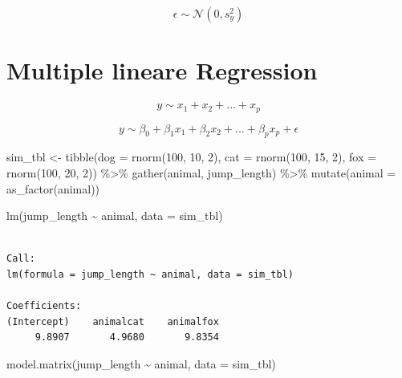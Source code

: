 \documentclass[
  letterpaper,
  DIV=11,
  oneside]{scrreport}
\newenvironment{Shaded}{\begin{snugshade}}{\end{snugshade}}
\newcommand{\AttributeTok}[1]{\textcolor[rgb]{0.40,0.45,0.13}{#1}}
\newcommand{\DecValTok}[1]{\textcolor[rgb]{0.68,0.00,0.00}{#1}}
\newcommand{\FunctionTok}[1]{\textcolor[rgb]{0.28,0.35,0.67}{#1}}
\newcommand{\NormalTok}[1]{\textcolor[rgb]{0.00,0.23,0.31}{#1}}
\newcommand{\OtherTok}[1]{\textcolor[rgb]{0.00,0.23,0.31}{#1}}
\newcommand{\SpecialCharTok}[1]{\textcolor[rgb]{0.37,0.37,0.37}{#1}}
\begin{document}
\[
\epsilon \sim \mathcal{N}(0, s^2_y)
\]

\hypertarget{multiple-lineare-regression}{%
\section*{Multiple lineare
Regression}\label{multiple-lineare-regression}}

\[
y \sim x_1 + x_2 + ... + x_p
\]

\[
y \sim \beta_0 + \beta_1 x_1 + \beta_2 x_2 + ... + \beta_p x_p + \epsilon
\]

\begin{Shaded}
\begin{Highlighting}[]
\NormalTok{sim\_tbl }\OtherTok{\textless{}{-}} \FunctionTok{tibble}\NormalTok{(}\AttributeTok{dog =} \FunctionTok{rnorm}\NormalTok{(}\DecValTok{100}\NormalTok{, }\DecValTok{10}\NormalTok{, }\DecValTok{2}\NormalTok{),}
                  \AttributeTok{cat =} \FunctionTok{rnorm}\NormalTok{(}\DecValTok{100}\NormalTok{, }\DecValTok{15}\NormalTok{, }\DecValTok{2}\NormalTok{),}
                  \AttributeTok{fox =} \FunctionTok{rnorm}\NormalTok{(}\DecValTok{100}\NormalTok{, }\DecValTok{20}\NormalTok{, }\DecValTok{2}\NormalTok{)) }\SpecialCharTok{\%\textgreater{}\%} 
  \FunctionTok{gather}\NormalTok{(animal, jump\_length) }\SpecialCharTok{\%\textgreater{}\%} 
  \FunctionTok{mutate}\NormalTok{(}\AttributeTok{animal =} \FunctionTok{as\_factor}\NormalTok{(animal))}

\FunctionTok{lm}\NormalTok{(jump\_length }\SpecialCharTok{\textasciitilde{}}\NormalTok{ animal, }\AttributeTok{data =}\NormalTok{ sim\_tbl)}
\end{Highlighting}
\end{Shaded}

\begin{verbatim}

Call:
lm(formula = jump_length ~ animal, data = sim_tbl)

Coefficients:
(Intercept)    animalcat    animalfox  
     9.8907       4.9680       9.8354  
\end{verbatim}

\begin{Shaded}
\begin{Highlighting}[]
\FunctionTok{model.matrix}\NormalTok{(jump\_length }\SpecialCharTok{\textasciitilde{}}\NormalTok{ animal, }\AttributeTok{data =}\NormalTok{ sim\_tbl)}
\end{Highlighting}
\end{Shaded}
\end{document}
